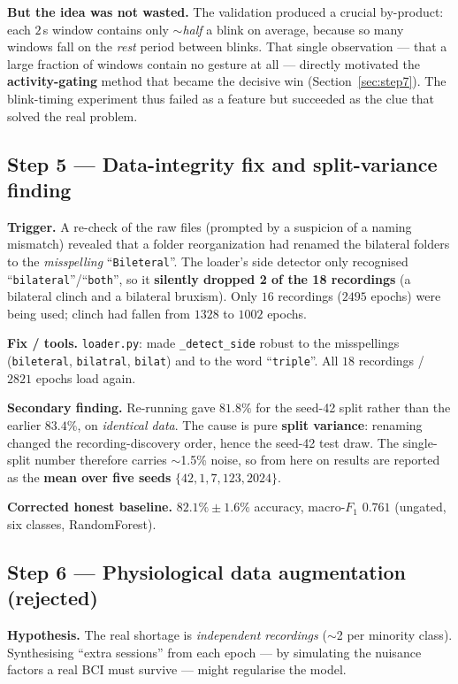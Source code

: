 \documentclass[11pt,a4paper]{article}
\newcommand{\fone}{$F_1$}
\newcommand{\code}[1]{\texttt{#1}}
\begin{document}
\textbf{But the idea was not wasted.} The validation produced a crucial
by-product: each $2$\,s window contains only $\sim$\emph{half} a blink on average,
because so many windows fall on the \emph{rest} period between blinks. That single
observation --- that a large fraction of windows contain no gesture at all ---
directly motivated the \textbf{activity-gating} method that became the decisive
win (Section~\ref{sec:step7}). The blink-timing experiment thus failed as a
feature but succeeded as the clue that solved the real problem.

\subsection{Step 5 --- Data-integrity fix and split-variance finding}
\label{sec:step5}
\textbf{Trigger.} A re-check of the raw files (prompted by a suspicion of a
naming mismatch) revealed that a folder reorganization had renamed the bilateral
folders to the \emph{misspelling} ``\code{Bileteral}''. The loader's side
detector only recognised ``\code{bilateral}''/``\code{both}'', so it
\textbf{silently dropped 2 of the 18 recordings} (a bilateral clinch and a
bilateral bruxism). Only $16$ recordings ($2495$ epochs) were being used; clinch
had fallen from $1328$ to $1002$ epochs.

\textbf{Fix / tools.} \code{loader.py}: made \code{\_detect\_side} robust to the
misspellings (\code{bileteral}, \code{bilatral}, \code{bilat}) and to the word
``\code{triple}''. All $18$ recordings / $2821$ epochs load again.

\textbf{Secondary finding.} Re-running gave $81.8\%$ for the seed-42 split rather
than the earlier $83.4\%$, on \emph{identical data}. The cause is pure
\textbf{split variance}: renaming changed the recording-discovery order, hence
the seed-42 test draw. The single-split number therefore carries $\sim$1.5\%
noise, so from here on results are reported as the \textbf{mean over five seeds}
$\{42,1,7,123,2024\}$.

\textbf{Corrected honest baseline.} $\mathbf{82.1\% \pm 1.6\%}$ accuracy,
macro-\fone{} $0.761$ (ungated, six classes, RandomForest).

\subsection{Step 6 --- Physiological data augmentation (rejected)}
\textbf{Hypothesis.} The real shortage is \emph{independent recordings}
($\sim$2 per minority class). Synthesising ``extra sessions'' from each epoch ---
by simulating the nuisance factors a real BCI must survive --- might regularise
the model.
\end{document}
